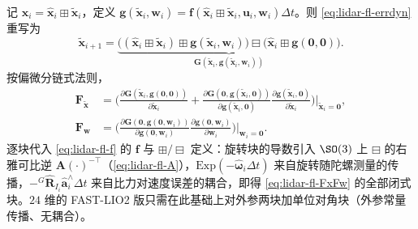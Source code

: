 \begin{derivation}
记 $\mathbf{x}_i=\hat{\mathbf{x}}_i\boxplus\tilde{\mathbf{x}}_i$，定义 $\mathbf{g}(\tilde{\mathbf{x}}_i,\mathbf{w}_i)=\mathbf{f}(\hat{\mathbf{x}}_i\boxplus\tilde{\mathbf{x}}_i,\mathbf{u}_i,\mathbf{w}_i)\Delta t$。则 \cref{eq:lidar-fl-errdyn} 重写为
\[
  \tilde{\mathbf{x}}_{i+1}=\underbrace{\big((\hat{\mathbf{x}}_i\boxplus\tilde{\mathbf{x}}_i)\boxplus\mathbf{g}(\tilde{\mathbf{x}}_i,\mathbf{w}_i)\big)\boxminus\big(\hat{\mathbf{x}}_i\boxplus\mathbf{g}(\mathbf{0},\mathbf{0})\big)}_{\mathbf{G}(\tilde{\mathbf{x}}_i,\mathbf{g}(\tilde{\mathbf{x}}_i,\mathbf{w}_i))}.
\]
按偏微分链式法则，
\begin{align*}
\mathbf{F}_{\tilde{\mathbf{x}}}&=\Big(\frac{\partial\mathbf{G}(\tilde{\mathbf{x}}_i,\mathbf{g}(\mathbf{0},\mathbf{0}))}{\partial\tilde{\mathbf{x}}_i}+\frac{\partial\mathbf{G}(\mathbf{0},\mathbf{g}(\tilde{\mathbf{x}}_i,\mathbf{0}))}{\partial\mathbf{g}(\tilde{\mathbf{x}}_i,\mathbf{0})}\frac{\partial\mathbf{g}(\tilde{\mathbf{x}}_i,\mathbf{0})}{\partial\tilde{\mathbf{x}}_i}\Big)\Big|_{\tilde{\mathbf{x}}_i=\mathbf{0}},\\
\mathbf{F}_{\mathbf{w}}&=\Big(\frac{\partial\mathbf{G}(\mathbf{0},\mathbf{g}(\mathbf{0},\mathbf{w}_i))}{\partial\mathbf{g}(\mathbf{0},\mathbf{w}_i)}\frac{\partial\mathbf{g}(\mathbf{0},\mathbf{w}_i)}{\partial\mathbf{w}_i}\Big)\Big|_{\mathbf{w}_i=\mathbf{0}}.
\end{align*}
逐块代入 \cref{eq:lidar-fl-f} 的 $\mathbf{f}$ 与 $\boxplus/\boxminus$ 定义：旋转块的导数引入 $\SO(3)$ 上 $\boxminus$ 的右雅可比逆 $\mathbf{A}(\cdot)^{-\top}$（\cref{eq:lidar-fl-A}），$\mathrm{Exp}(-\hat{\boldsymbol{\omega}}_i\Delta t)$ 来自旋转随陀螺测量的传播，$-{}^G\hat{\mathbf{R}}_{I_i}\hat{\mathbf{a}}_i^\wedge\Delta t$ 来自比力对速度误差的耦合，即得 \cref{eq:lidar-fl-FxFw} 的全部闭式块。$24$ 维的 FAST-LIO2 版只需在此基础上对外参两块加单位对角块（外参常量传播、无耦合）。
\end{derivation}

